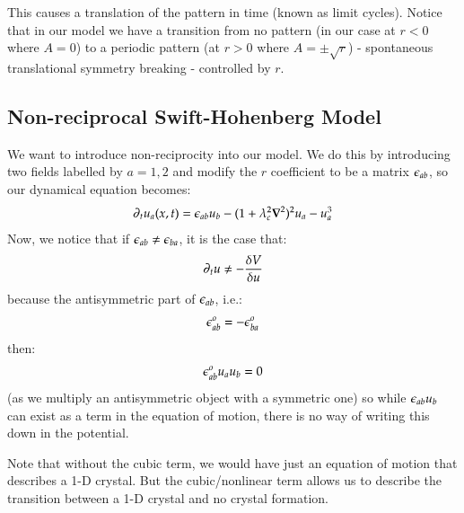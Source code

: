 This causes a translation of the pattern in time (known as limit cycles). Notice that in our model we have a transition from no pattern (in our case at $r < 0$ where $A = 0$) to a periodic pattern (at $r > 0$ where $A = \pm\sqrt{r}$) - spontaneous translational symmetry breaking - controlled by $r$.

\subsection{Non-reciprocal Swift-Hohenberg Model}
We want to introduce non-reciprocity into our model. We do this by introducing two fields labelled by $a = 1, 2$ and modify the $r$ coefficient to be a matrix $\epsilon_{ab}$, so our dynamical equation becomes:
\begin{equation}
    \p_t u_a(x, t) = \e_{ab}u_b - (1 + \lambda_c^2\nabla^2)^2u_a - u_a^3
\end{equation}
Now, we notice that if $\epsilon_{ab} \neq \epsilon_{ba}$, it is the case that:
\begin{equation}
    \partial_t u \neq -\frac{\delta V}{\delta u}
\end{equation}
because the antisymmetric part of $\epsilon_{ab}$, i.e.:
\begin{equation}
    \epsilon_{ab}^o = - \epsilon^o_{ba}
\end{equation}
then:
\begin{equation}
    \epsilon^o_{ab}u_a u_b = 0
\end{equation}
(as we multiply an antisymmetric object with a symmetric one) so while $\epsilon_{ab}u_b$ can exist as a term in the equation of motion, there is no way of writing this down in the potential.

Note that without the cubic term, we would have just an equation of motion that describes a 1-D crystal. But the cubic/nonlinear term allows us to describe the transition between a 1-D crystal and no crystal formation.

